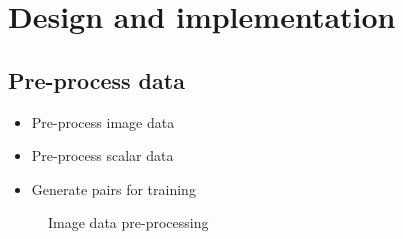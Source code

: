 
\section{Design and implementation}

\subsection{Pre-process data}
\begin{frame}{\insertsubsec}
  \begin{itemize}
    \item Pre-process image data
    \item Pre-process scalar data
    \item Generate pairs for training
  \end{itemize}

  \begin{figure}
    \centering
    \scalebox{.5}{}
    \caption{Image data pre-processing}
  \end{figure}
\end{frame}